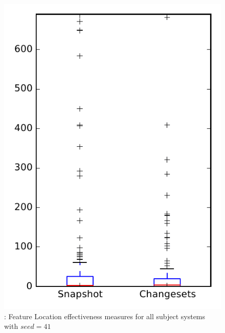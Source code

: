 
\begin{figure}
\centering
\includegraphics[height=0.4\textheight]{figures/flt_seed/rq1_overview_41}
\caption{\rone: Feature Location effectiveness measures for all subject systems with $seed=41$}
\label{fig:flt_seed:rq1:overview}
\end{figure}
